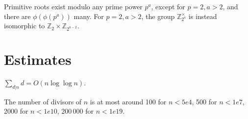 	Primitive roots exist modulo any prime power $p^a$, except for $p = 2, a > 2$, and there are $\phi(\phi(p^a))$ many.
	For $p = 2, a > 2$, the group $\mathbb Z_{2^a}^\times$ is instead isomorphic to $\mathbb Z_2 \times \mathbb Z_{2^{a-2}}$.

\section{Estimates}
	$\sum_{d|n} d = O(n \log \log n)$.

	The number of divisors of $n$ is at most around 100 for $n < 5e4$, 500 for $n < 1e7$, 2000 for $n < 1e10$, 200\,000 for $n < 1e19$.




